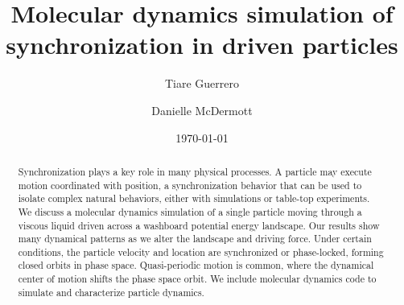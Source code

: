 \documentclass[twocolumn,preprintnumbers,amsmath,amssymb,aps,prx]{revtex4}
\begin{document}

\title{Molecular dynamics simulation of synchronization in driven particles}

\author{Tiare Guerrero}

\author{Danielle McDermott}

\date{\today}

\begin{abstract}
  Synchronization
  plays a key role in many physical processes.
  A particle may
  execute
  motion 
  coordinated  with position,
  a synchronization behavior
  that 
  can be used to isolate
  complex natural behaviors,  %
  either with
  simulations or table-top experiments.
  We discuss a %
  molecular dynamics simulation
  of a single particle
  moving through
  a viscous liquid
  driven 
  across a washboard potential energy landscape.
  Our results show many dynamical patterns
  as we alter the landscape and driving force.
  Under certain conditions,
  the particle velocity and location
  are synchronized or 
  phase-locked,
  forming closed orbits in phase space.
  Quasi-periodic motion is common, %
  where the
  dynamical center of motion shifts the
  phase space orbit.
  We include molecular dynamics code %
  to simulate and characterize
  particle dynamics.
\end{abstract}
\end{document}
